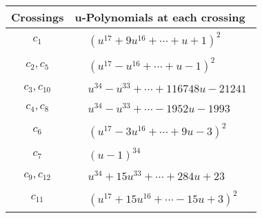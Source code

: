 \documentclass[1p]{elsarticle_modified}
\theoremstyle{definition}
\begin{document}
\begin{tabular}{m{50pt}|m{274pt}}
Crossings & \hspace{64pt}u-Polynomials at each crossing \\
\hline $$\begin{aligned}c_{1}\end{aligned}$$&$\begin{aligned}
&(u^{17}+9 u^{16}+\cdots+u+1)^{2}
\end{aligned}$\\
\hline $$\begin{aligned}c_{2},c_{5}\end{aligned}$$&$\begin{aligned}
&(u^{17}- u^{16}+\cdots+u-1)^{2}
\end{aligned}$\\
\hline $$\begin{aligned}c_{3},c_{10}\end{aligned}$$&$\begin{aligned}
&u^{34}- u^{33}+\cdots+116748 u-21241
\end{aligned}$\\
\hline $$\begin{aligned}c_{4},c_{8}\end{aligned}$$&$\begin{aligned}
&u^{34}- u^{33}+\cdots-1952 u-1993
\end{aligned}$\\
\hline $$\begin{aligned}c_{6}\end{aligned}$$&$\begin{aligned}
&(u^{17}-3 u^{16}+\cdots+9 u-3)^{2}
\end{aligned}$\\
\hline $$\begin{aligned}c_{7}\end{aligned}$$&$\begin{aligned}
&(u-1)^{34}
\end{aligned}$\\
\hline $$\begin{aligned}c_{9},c_{12}\end{aligned}$$&$\begin{aligned}
&u^{34}+15 u^{33}+\cdots+284 u+23
\end{aligned}$\\
\hline $$\begin{aligned}c_{11}\end{aligned}$$&$\begin{aligned}
&(u^{17}+15 u^{16}+\cdots-15 u+3)^{2}
\end{aligned}$\\
\hline
\end{tabular}\\~\\
\end{document}
